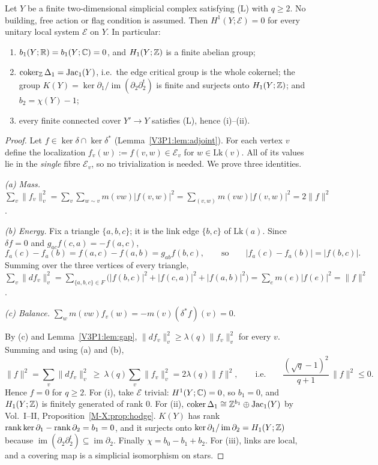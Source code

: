 \begin{theorem}\label{V3P1:thm:garland}
Let $Y$ be a finite two-dimensional simplicial complex satisfying \textup{(L)} with $q\ge2$.
No building, free action or flag condition is assumed. Then $H^{1}(Y;\mathcal E)=0$ for every
unitary local system $\mathcal E$ on $Y$. In particular:
\begin{enumerate}
\item[(i)] $b_1(Y;\mathbb{R})=b_1(Y;\mathbb{C})=0$, and $H_1(Y;\mathbb{Z})$ is a finite abelian group;
\item[(ii)] $\operatorname{coker}_{\mathbb{Z}}\Delta_1=\operatorname{Jac}_1(Y)$, i.e.\ the edge critical group is the whole cokernel;
the group $K(Y)=\ker\partial_1/\operatorname{im}(\partial_2\partial_2^{t})$ is finite and
surjects onto $H_1(Y;\mathbb{Z})$; and $b_2=\chi(Y)-1$;
\item[(iii)] every finite connected cover $Y'\to Y$ satisfies \textup{(L)}, hence (i)--(ii).
\end{enumerate}
\end{theorem}

\begin{proof}
Let $f\in\ker\delta\cap\ker\delta^{*}$ (Lemma~\ref{V3P1:lem:adjoint}). For each vertex $v$
define the localization $f_v(w):=f(v,w)\in\mathcal E_v$ for $w\in\mathrm{Lk}(v)$. All of its
values lie in the \emph{single} fibre $\mathcal E_v$, so no trivialization is needed. We prove
three identities.

\emph{(a) Mass.} $\sum_v\|f_v\|_v^{2}=\sum_v\sum_{w\sim v}m(vw)|f(v,w)|^{2}
=\sum_{(v,w)}m(vw)|f(v,w)|^{2}=2\|f\|^{2}$.

\emph{(b) Energy.} Fix a triangle $\{a,b,c\}$; it is the link edge $\{b,c\}$ of
$\mathrm{Lk}(a)$. Since $\delta f=0$ and $g_{ac}f(c,a)=-f(a,c)$,
\[
f_a(c)-f_a(b)=f(a,c)-f(a,b)=g_{ab}f(b,c),\qquad\text{so}\qquad |f_a(c)-f_a(b)|=|f(b,c)|.
\]
Summing over the three vertices of every triangle,
$\sum_v\|df_v\|_v^{2}=\sum_{\{a,b,c\}\in F}\bigl(|f(b,c)|^{2}+|f(c,a)|^{2}+|f(a,b)|^{2}\bigr)
=\sum_{e}m(e)|f(e)|^{2}=\|f\|^{2}$.

\emph{(c) Balance.} $\sum_{w}m(vw)f_v(w)=-m(v)(\delta^{*}f)(v)=0$.

By (c) and Lemma~\ref{V3P1:lem:gap}, $\|df_v\|_v^{2}\ge\lambda(q)\|f_v\|_v^{2}$ for every $v$.
Summing and using (a) and (b),
\[
\|f\|^{2}=\sum_v\|df_v\|_v^{2}\ \ge\ \lambda(q)\sum_v\|f_v\|_v^{2}=2\lambda(q)\|f\|^{2},
\qquad\text{i.e.}\qquad \frac{(\sqrt q-1)^{2}}{q+1}\,\|f\|^{2}\le0 .
\]
Hence $f=0$ for $q\ge2$. For (i), take $\mathcal E$ trivial: $H^{1}(Y;\mathbb{C})=0$, so $b_1=0$, and
$H_1(Y;\mathbb{Z})$ is finitely generated of rank $0$. For (ii), $\operatorname{coker}\Delta_1\cong\mathbb{Z}^{b_1}\oplus
\operatorname{Jac}_1(Y)$ by Vol.~I--II, Proposition~\ref{M-X:prop:hodge}. $K(Y)$ has rank $\operatorname{rank}\ker\partial_1-
\operatorname{rank}\partial_2=b_1=0$, and it surjects onto $\ker\partial_1/\operatorname{im}\partial_2=
H_1(Y;\mathbb{Z})$ because $\operatorname{im}(\partial_2\partial_2^{t})\subseteq\operatorname{im}
\partial_2$. Finally $\chi=b_0-b_1+b_2$. For (iii), links are local, and a covering map is a
simplicial isomorphism on stars.
\end{proof}

